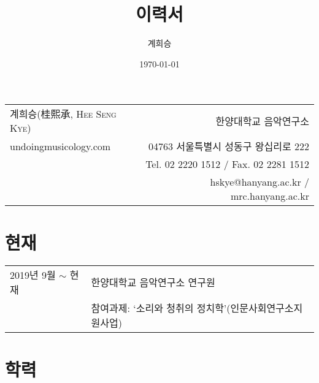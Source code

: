 \documentclass[dvipdfmx,a4paper]{article}
\title{이력서}
\author{계희승}
\date{\today}
\begin{document}
  \renewcommand{\headrulewidth}{0pt}
  \fancyhf{}
  \fancyfoot[RE,RO]{\small \thepage}
  
  \hspace*{-0.8cm}
  \begin{tabular}{p{7.6cm} r}
    {\large 계희승(桂熙承, \textsc{Hee Seng Kye})} & 한양대학교 음악연구소\\
    undoingmusicology.com & 04763 서울특별시 성동구 왕십리로 222\\
    & Tel. 02 2220 1512 / Fax. 02 2281 1512\\
    & hskye@hanyang.ac.kr / mrc.hanyang.ac.kr
  \end{tabular}
  
  \vspace{15mm}
  
  \section*{\normalsize 현재}
  
  \hspace*{-0.25cm}
  \begin{tabular}{p{4.0cm} l}
    2019년 9월 $\sim$ 현재 & 한양대학교 음악연구소 연구원\\
    & 참여과제: `소리와 청취의 정치학'(인문사회연구소지원사업)
  \end{tabular}
  
  \vspace*{2.5mm}
  
  \section*{\normalsize 학력}
  
\end{document}
